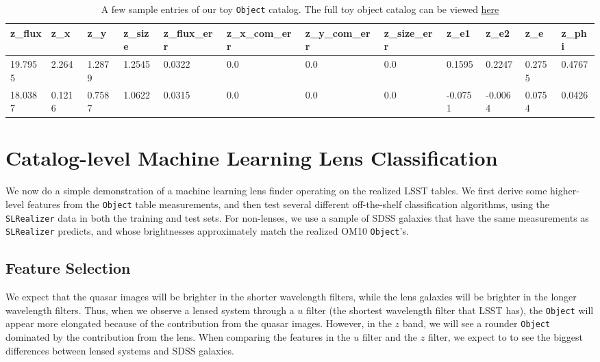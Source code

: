 \documentclass[\docopts]{\docclass}
\def\SLRealizer{\texttt{SLRealizer}\xspace}
\def\Object{\texttt{Object}\xspace}
\begin{document}
\begin{table}[!h]
\begin{tabular}{|l|l|l|l|l|l|l|l|l|l|l|l|}
\hline
z\_flux & z\_x   & z\_y   & z\_size & z\_flux\_err & z\_x\_com\_err & z\_y\_com\_err & z\_size\_err & z\_e1   & z\_e2   & z\_e   & z\_phi \\ \hline
19.7955 & 2.264  & 1.2879 & 1.2545  & 0.0322       & 0.0            & 0.0            & 0.0          & 0.1595  & 0.2247  & 0.2755 & 0.4767 \\
18.0387 & 0.1216 & 0.7587 & 1.0622  & 0.0315       & 0.0            & 0.0            & 0.0          & -0.0751 & -0.0064 & 0.0754 & 0.0426 \\ \hline
\end{tabular}

\caption{A few sample entries of our toy \Object catalog. The full toy
object catalog can be viewed
\href{https://www.dropbox.com/s/ob51rxjexzuervl/toy_object_catalog.csv?dl=0}{here}}
\label{tab:object}
\end{table}



\section{Catalog-level Machine Learning Lens Classification}
\label{sec:ml}

We now do a simple demonstration of a machine learning lens finder
operating on the realized LSST tables. We first derive some higher-level
features from the \Object table measurements, and then test several
different off-the-shelf classification algorithms, using the \SLRealizer
data in both the training and test sets. For non-lenses, we use a sample
of SDSS galaxies that have the same measurements as \SLRealizer
predicts, and whose brightnesses approximately match the realized OM10
\Object's.

\subsection{Feature Selection}
\label{subsec:feature}

We expect that the quasar images will be brighter in the shorter
wavelength filters, while the lens galaxies will be brighter in the
longer wavelength filters. Thus, when we observe a lensed system through
a $u$ filter (the shortest wavelength filter that LSST has), the \Object
will appear more elongated because of the contribution from the quasar
images. However, in the $z$ band, we will see a rounder \Object
dominated by  the contribution from the lens. When comparing the
features in the $u$ filter and the $z$ filter, we expect to to see the
biggest differences between lensed systems and SDSS galaxies.
\end{document}
